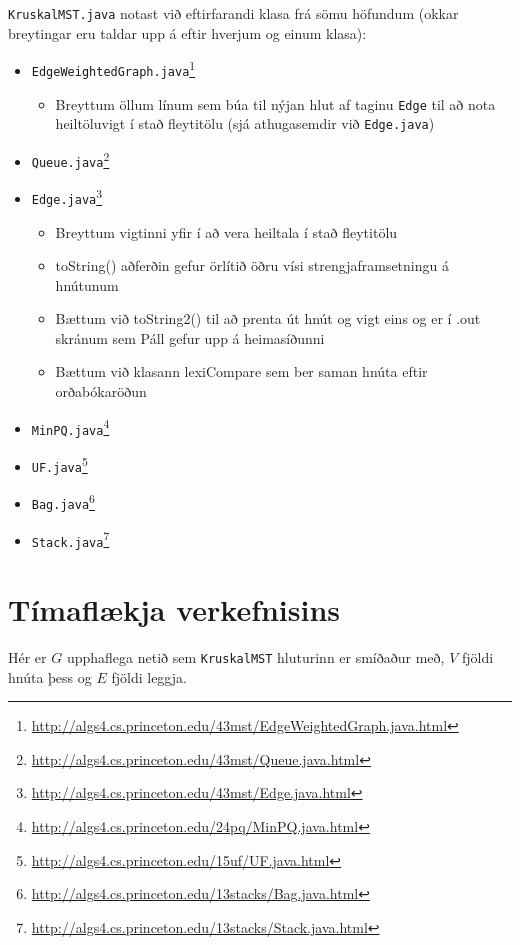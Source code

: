 \documentclass[a4paper,oneside]{article}
\begin{document}
\noindent
\texttt{KruskalMST.java} notast við eftirfarandi klasa frá sömu höfundum (okkar breytingar eru taldar upp á eftir hverjum og einum klasa):
\begin{itemize}
    \item \texttt{EdgeWeightedGraph.java}\footnote{\url{http://algs4.cs.princeton.edu/43mst/EdgeWeightedGraph.java.html}}
        \begin{itemize}
            \item Breyttum öllum línum sem búa til nýjan hlut af taginu \texttt{Edge} til að nota heiltöluvigt í stað fleytitölu (sjá athugasemdir við \texttt{Edge.java})
        \end{itemize}
    \item \texttt{Queue.java}\footnote{\url{http://algs4.cs.princeton.edu/43mst/Queue.java.html}}
    \item \texttt{Edge.java}\footnote{\url{http://algs4.cs.princeton.edu/43mst/Edge.java.html}}
        \begin{itemize}
            \item Breyttum vigtinni yfir í að vera heiltala í stað fleytitölu
            \item toString() aðferðin gefur örlítið öðru vísi strengjaframsetningu á hnútunum 
            \item Bættum við toString2() til að prenta út hnút og vigt eins og er í .out skránum sem Páll gefur upp á heimasíðunni
            \item Bættum við klasann lexiCompare sem ber saman hnúta eftir orðabókaröðun
        \end{itemize}
    \item \texttt{MinPQ.java}\footnote{\url{http://algs4.cs.princeton.edu/24pq/MinPQ.java.html}}
    \item \texttt{UF.java}\footnote{\url{http://algs4.cs.princeton.edu/15uf/UF.java.html}}
    \item \texttt{Bag.java}\footnote{\url{http://algs4.cs.princeton.edu/13stacks/Bag.java.html}}
    \item \texttt{Stack.java}\footnote{\url{http://algs4.cs.princeton.edu/13stacks/Stack.java.html}}
\end{itemize}


\section{Tímaflækja verkefnisins}
Hér er $G$ upphaflega netið sem \texttt{KruskalMST} hluturinn er smíðaður með, $V$ fjöldi hnúta þess og $E$ fjöldi leggja.
\end{document}
